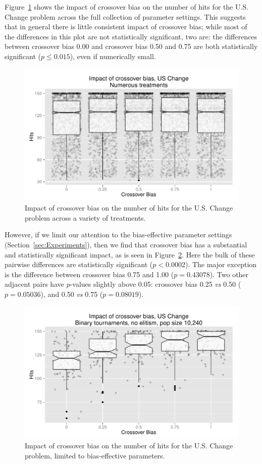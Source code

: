 \documentclass{sig-alternate}
\begin{document}
Figure~\ref{fig:USChange_Hits} shows the impact of crossover bias on the number of hits for the U.S. Change problem
across the full collection of parameter settings. This suggests that in general there is little consistent impact of
crossover bias; while most of the differences in this
plot are not statistically significant, two are: the differences between crossover bias 0.00 and crossover bias 0.50 and
0.75 are both statistically significant ($p \leq 0.015$), even if numerically small.

\begin{figure}
\centering
\includegraphics[width=0.45 \textwidth]{Plots/US_change_hits.pdf}
\caption{Impact of crossover bias on the number of hits for the U.S. Change problem across a variety of treatments.}
\label{fig:USChange_Hits}
\end{figure}

%
%
%
%

However, if we limit our attention to the bias-effective parameter settings (Section~\ref{sec:Experiments}), then we
find that crossover bias has a substantial and statistically significant impact, as is seen in
Figure~\ref{fig:USChange_Hits_strong}. Here the bulk of these pairwise differences are statistically significant
($p<0.0002$). The major exception is the difference between
crossover bias 0.75 and 1.00 ($p=0.43078$). Two other adjacent pairs have $p$-values slightly above 0.05: crossover bias
0.25 \emph{vs} 0.50 ($p=0.05036$), and 0.50 \emph{vs} 0.75 ($p=0.08019$).

\begin{figure}
\centering
\includegraphics[width=0.45 \textwidth]{Plots/US_change_hits_strong.pdf}
\caption{Impact of crossover bias on the number of hits for the U.S. Change problem, limited to bias-effective parameters.}
\label{fig:USChange_Hits_strong}
\end{figure}
\end{document}
